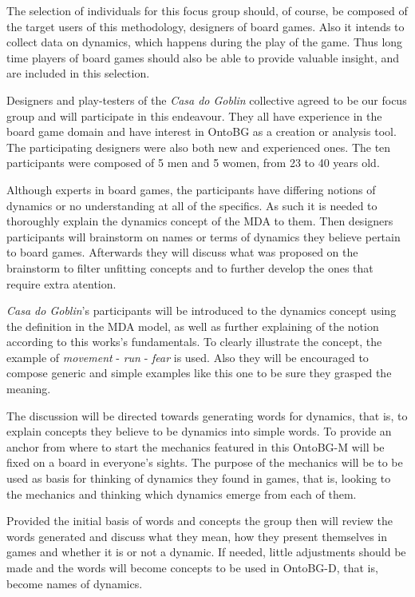 The selection of individuals for this focus group should, of course, be composed of the target users of this methodology, designers of board games. Also it intends to collect data on dynamics, which happens during the play of the game. Thus long time players of board games should also be able to provide valuable insight, and are included in this selection. 

Designers and play-testers of the \textit{Casa do Goblin} collective agreed to be our focus group and will participate in this endeavour. They all have experience in the board game domain and have interest in OntoBG as a creation or analysis tool. The participating designers were also both new and experienced ones. The ten participants were composed of 5 men and 5 women, from 23 to 40 years old.

Although experts in board games, the participants have differing notions of dynamics or no understanding at all of the specifics. As such it is needed to thoroughly explain the dynamics concept of the MDA to them. Then designers participants will brainstorm on names or terms of dynamics they believe pertain to board games. Afterwards they will discuss what was proposed on the brainstorm to filter unfitting concepts and to further develop the ones that require extra atention.

\textit{Casa do Goblin}'s participants will be introduced to the dynamics concept using the definition in the MDA model, as well as further explaining of the notion according to this works's fundamentals. To clearly illustrate the concept, the example of \textit{movement} - \textit{run} - \textit{fear}  is used. Also they will be encouraged to compose generic and simple examples like this one to be sure they grasped the meaning. 

The discussion will be directed towards generating words for dynamics, that is, to explain concepts they believe to be dynamics into simple words. To provide an anchor from where to start the mechanics featured in this OntoBG-M will be fixed on a board in everyone's sights. The purpose of the mechanics will be to be used as basis for thinking of dynamics they found in games, that is, looking to the mechanics and thinking which dynamics emerge from each of them.

Provided the initial basis of words and concepts the group then will review the words generated and discuss what they mean, how they present themselves in games and whether it is or not a dynamic. If needed, little adjustments should be made and the words will become concepts to be used in OntoBG-D, that is, become names of dynamics.

